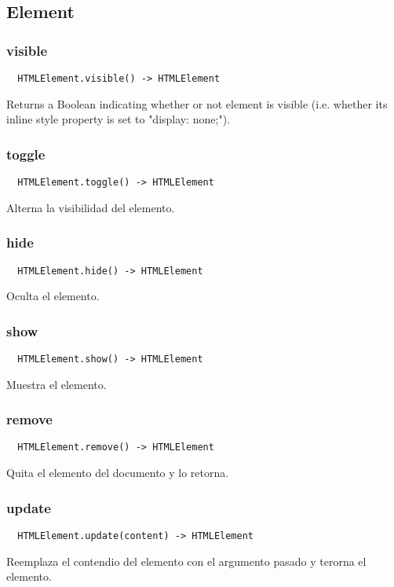 \subsection{Element}
\subsubsection*{visible}
\begin{verbatim}
  HTMLElement.visible() -> HTMLElement
\end{verbatim}
Returns a Boolean indicating whether or not element is visible (i.e. whether its
inline style property is set to "display: none;").

\subsubsection*{toggle}
\begin{verbatim}
  HTMLElement.toggle() -> HTMLElement
\end{verbatim}
Alterna la visibilidad del elemento.

\subsubsection*{hide}
\begin{verbatim}
  HTMLElement.hide() -> HTMLElement
\end{verbatim}
Oculta el elemento.

\subsubsection*{show}
\begin{verbatim}
  HTMLElement.show() -> HTMLElement
\end{verbatim}
Muestra el elemento.

\subsubsection*{remove}
\begin{verbatim}
  HTMLElement.remove() -> HTMLElement
\end{verbatim}
Quita el elemento del documento y lo retorna.

\subsubsection*{update}
\begin{verbatim}
  HTMLElement.update(content) -> HTMLElement
\end{verbatim}
Reemplaza el contendio del elemento con el argumento pasado y terorna el
elemento.

